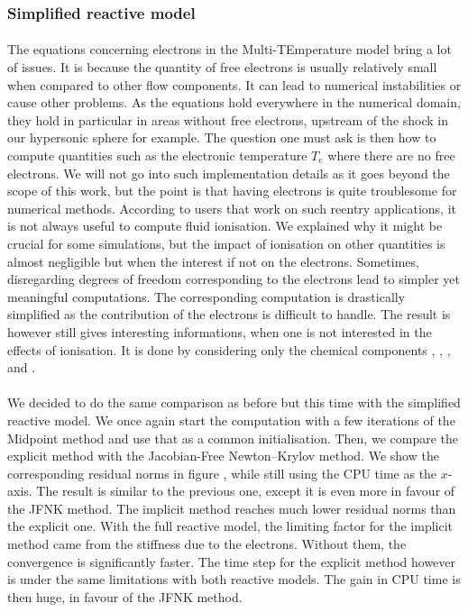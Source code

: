       \subsubsection{Simplified reactive model}

        \paragraph{}
        The equations concerning electrons in the Multi-TEmperature model bring a lot of issues.
        It is because the quantity of free electrons is usually relatively small when compared to other flow components.
        It can lead to numerical instabilities or cause other problems.
        As the equations hold everywhere in the numerical domain, they hold in particular in areas without free electrons, upstream of the shock in our hypersonic sphere for example.
        The question one must ask is then how to compute quantities such as the electronic temperature $T_e$ where there are no free electrons.
        We will not go into such implementation details as it goes beyond the scope of this work, but the point is that having electrons is quite troublesome for numerical methods.
        According to users that work on such reentry applications, it is not always useful to compute fluid ionisation.
        We explained why it might be crucial for some simulations, but the impact of ionisation on other quantities is almost negligible but when the interest if not on the electrons.
        Sometimes, disregarding degrees of freedom corresponding to the electrons lead to simpler yet meaningful computations.
        The corresponding computation is drastically simplified as the contribution of the electrons is difficult to handle.
        The result is however still gives interesting informations, when one is not interested in the effects of ionisation.
        It is done by considering only the chemical components , , ,  and .

        \paragraph{}
        We decided to do the same comparison as before but this time with the simplified reactive model.
        We once again start the computation with a few iterations of the Midpoint method and use that as a common initialisation.
        Then, we compare the explicit method with the Jacobian-Free Newton--Krylov method.
        We show the corresponding residual norms in figure , while still using the CPU time as the $x$-axis.
        The result is similar to the previous one, except it is even more in favour of the JFNK method.
        The implicit method reaches much lower residual norms than the explicit one.
        With the full reactive model, the limiting factor for the implicit method came from the stiffness due to the electrons.
        Without them, the convergence is significantly faster.
        The time step for the explicit method however is under the same limitations with both reactive models.
        The gain in CPU time is then huge, in favour of the JFNK method.
